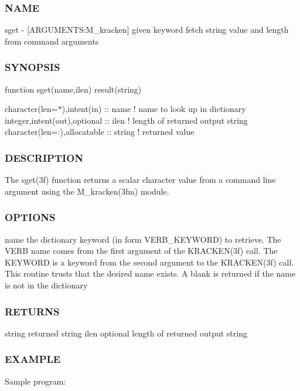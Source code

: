\subsubsection*{N\+A\+ME}

sget -\/ \mbox{[}A\+R\+G\+U\+M\+E\+N\+TS\+:M\+\_\+kracken\mbox{]} given keyword fetch string value and length from command arguments \subsubsection*{S\+Y\+N\+O\+P\+S\+IS}

function sget(name,ilen) result(string)

character(len=$\ast$),intent(in) \+:\+: name ! name to look up in dictionary integer,intent(out),optional \+:\+: ilen ! length of returned output string character(len=\+:),allocatable \+:\+: string ! returned value

\subsubsection*{D\+E\+S\+C\+R\+I\+P\+T\+I\+ON}

The sget(3f) function returns a scalar character value from a command line argument using the M\+\_\+kracken(3fm) module.

\subsubsection*{O\+P\+T\+I\+O\+NS}

name the dictionary keyword (in form V\+E\+R\+B\+\_\+\+K\+E\+Y\+W\+O\+RD) to retrieve. The V\+E\+RB name comes from the first argument of the K\+R\+A\+C\+K\+E\+N(3f) call. The K\+E\+Y\+W\+O\+RD is a keyword from the second argument to the K\+R\+A\+C\+K\+E\+N(3f) call. This routine trusts that the desired name exists. A blank is returned if the name is not in the dictionary

\subsubsection*{R\+E\+T\+U\+R\+NS}

string returned string ilen optional length of returned output string

\subsubsection*{E\+X\+A\+M\+P\+LE}

Sample program\+:

